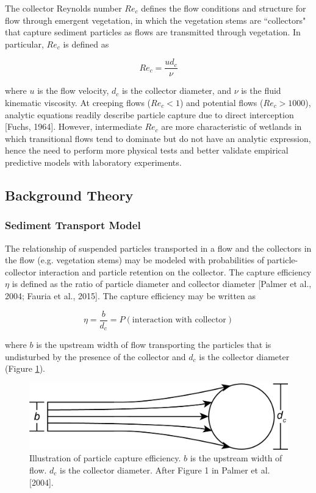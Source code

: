 \documentclass[12pt]{article}
\begin{document}
The collector Reynolds number $Re_c$ defines the flow conditions and structure for flow through emergent vegetation, in which the vegetation stems are ``collectors" that capture sediment particles as flows are transmitted through vegetation. In particular, $Re_c$ is defined as

\begin{equation} \label{Rec}
    Re_c=\frac{u d_c}{\nu}
\end{equation}

\noindent where $u$ is the flow velocity, $d_c$ is the collector diameter, and $\nu$ is the fluid kinematic viscosity. At creeping flows ($Re_c < 1$) and potential flows ($Re_c > 1000$), analytic equations readily describe particle capture due to direct interception [Fuchs, 1964]. However, intermediate $Re_c$ are more characteristic of wetlands in which transitional flows tend to dominate but do not have an analytic expression, hence the need to perform more physical tests and better validate empirical predictive models with laboratory experiments.

\subsection{Background Theory}

\subsubsection{Sediment Transport Model}

The relationship of suspended particles transported in a flow and the collectors in the flow (e.g. vegetation stems) may be modeled with probabilities of particle-collector interaction and particle retention on the collector. The capture efficiency $\eta$ is defined as the ratio of particle diameter and collector diameter [Palmer et al., 2004; Fauria et al., 2015]. The capture efficiency may be written as

\begin{equation} \label{ce}
    \eta=\frac{b}{d_c}=P(\text{interaction with collector})
\end{equation}

\noindent where $b$ is the upstream width of flow transporting the particles that is undisturbed by the presence of the collector and $d_c$ is the collector diameter (Figure \ref{fig_capeff}).

\begin{figure}[H]
    \centering
    \includegraphics[width=6.5in]{capture_efficiency.png}
    \caption{Illustration of particle capture efficiency. $b$ is the upstream width of flow. $d_c$ is the collector diameter. After Figure 1 in Palmer et al. [2004].}
    \label{fig_capeff}
\end{figure}
\end{document}
